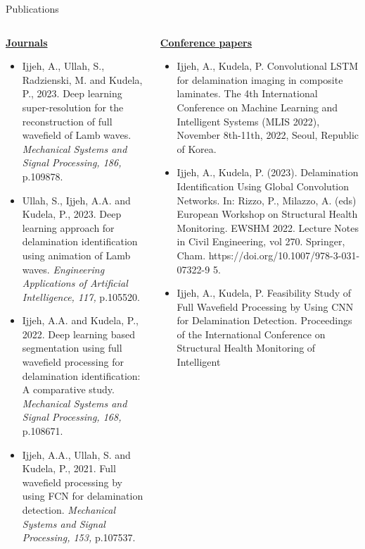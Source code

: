 \documentclass[10pt,aspectratio=169,dvipsnames]{beamer} %
\begin{document}
	\begin{frame}{Publications}
		\vspace{5pt}
		\begin{tiny}					
			\begin{columns}[T]
				\begin{column}[t]{0.48\textwidth}
					\underline{\textbf{Journals}}
					\begin{itemize}
						\item Ijjeh, A., Ullah, S., Radzienski, M. and Kudela, P., 2023. Deep learning super-resolution for the reconstruction of full wavefield of Lamb waves. \textit{Mechanical Systems and Signal Processing, 186, }p.109878.
						\item Ullah, S., Ijjeh, A.A. and Kudela, P., 2023. Deep learning approach for delamination identification using animation of Lamb waves. \textit{Engineering Applications of Artificial Intelligence, 117,} p.105520.
						\item Ijjeh, A.A. and Kudela, P., 2022. Deep learning based segmentation using full wavefield processing for delamination identification: A comparative study. \textit{Mechanical Systems and Signal Processing, 168,} p.108671.
						\item Ijjeh, A.A., Ullah, S. and Kudela, P., 2021. Full wavefield processing by using FCN for delamination detection. \textit{Mechanical Systems and Signal Processing, 153,} p.107537.					
					\end{itemize}					
				\end{column}
				\begin{column}[t]{0.48\textwidth}
					\underline{\textbf{Conference papers}}
					\begin{itemize}
						\item {Ijjeh, A.}, Kudela, P. Convolutional LSTM for delamination imaging in composite laminates. 
						The 4th International Conference on Machine Learning and Intelligent Systems (MLIS 2022), November 8th-11th, 2022, Seoul, Republic of Korea.
						\item {Ijjeh, A.}, Kudela, P. (2023). Delamination Identification Using Global Convolution Networks. In: Rizzo,
						P., Milazzo, A. (eds) European Workshop on Structural Health Monitoring. EWSHM 2022. Lecture Notes
						in Civil Engineering, vol 270. Springer, Cham. https://doi.org/10.1007/978-3-031-07322-9 5.		
						\item {Ijjeh, A.}, Kudela, P. Feasibility Study of Full Wavefield Processing by Using CNN for Delamination
						Detection. 
						Proceedings of the International Conference on Structural Health Monitoring of Intelligent

\end{itemize}
\end{column}
\end{columns}
\end{tiny}
\end{frame}
\end{document}

